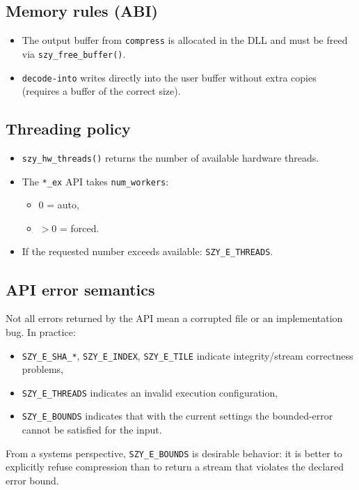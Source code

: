 \documentclass[11pt,a4paper]{article}
\begin{document}
\subsection{Memory rules (ABI)}
\begin{itemize}
  \item The output buffer from \texttt{compress} is allocated in the DLL and must be freed via \texttt{szy\_free\_buffer()}.
  \item \texttt{decode-into} writes directly into the user buffer without extra copies (requires a buffer of the correct size).
\end{itemize}

\subsection{Threading policy}
\begin{itemize}
  \item \texttt{szy\_hw\_threads()} returns the number of available hardware threads.
  \item The \texttt{*\_ex} API takes \texttt{num\_workers}:
    \begin{itemize}
      \item 0 = auto,
      \item $>0$ = forced.
    \end{itemize}
  \item If the requested number exceeds available: \texttt{SZY\_E\_THREADS}.
\end{itemize}

\subsection{API error semantics}
Not all errors returned by the API mean a corrupted file or an implementation bug. In practice:
\begin{itemize}
  \item \texttt{SZY\_E\_SHA\_*}, \texttt{SZY\_E\_INDEX}, \texttt{SZY\_E\_TILE} indicate integrity/stream correctness problems,
  \item \texttt{SZY\_E\_THREADS} indicates an invalid execution configuration,
  \item \texttt{SZY\_E\_BOUNDS} indicates that with the current settings the bounded-error cannot be satisfied for the input.
\end{itemize}

From a systems perspective, \texttt{SZY\_E\_BOUNDS} is desirable behavior: it is better to explicitly refuse compression than to return a stream that violates the declared error bound.
\end{document}
